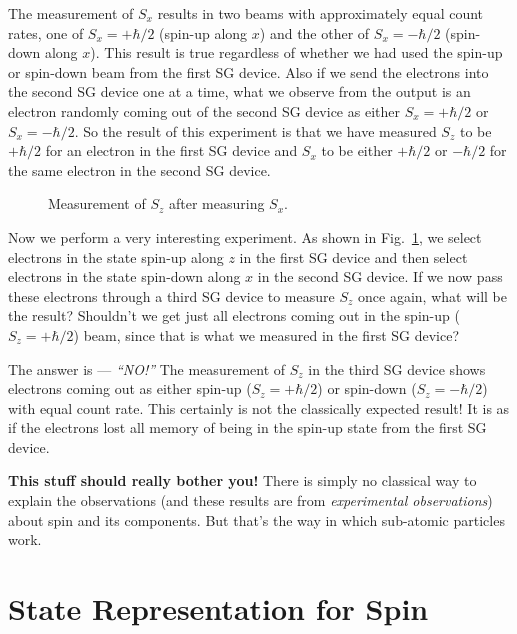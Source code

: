 The measurement of $S_x$ results in two beams with approximately equal
count rates, one of $S_x = +\hbar/2$ (spin-up along $x$) and the other of
$S_x = -\hbar/2$ (spin-down along $x$).  This result is true regardless
of whether we had used the spin-up or spin-down beam from the first SG
device.  Also if we send the electrons into the second SG device one at a
time, what we observe from the output is an electron randomly coming out
of the second SG device as either $S_x = +\hbar/2$ or $S_x = -\hbar/2$.
So the result of this experiment is that we have measured $S_z$ to be
$+\hbar/2$ for an electron in the first SG device and $S_x$ to be either
$+\hbar/2$ or $-\hbar/2$ for the same electron in the second SG device.

\begin{figure}[b]
\begin{center}
\caption{Measurement of $S_z$ after measuring $S_x$.}
\label{fig:SGDevice4}
\end{center}
\end{figure}

Now we perform a very interesting experiment.  As shown in
Fig.~\ref{fig:SGDevice4}, we select electrons in the state spin-up
along $z$ in the first SG device and then select electrons in the state
spin-down along $x$ in the second SG device.  If we now pass these
electrons through a third SG device to measure $S_z$ once again, what
will be the result?  Shouldn't we get just all electrons coming out in
the spin-up ($S_z = +\hbar/2$) beam, since that is what we measured in
the first SG device?

The answer is --- {\it ``NO!''\/}  The measurement of $S_z$ in the third
SG device shows electrons coming out as either spin-up ($S_z = +\hbar/2$)
or spin-down ($S_z = -\hbar/2$) with equal count rate.  This certainly
is not the classically expected result!  It is as if the electrons lost
all memory of being in the spin-up state from the first SG device.

{\bf This stuff should really bother you!}  There is simply no
classical way to explain the observations (and these results are from
{\it experimental observations\/}) about spin and its components.
But that's the way in which sub-atomic particles work.



\section{State Representation for Spin}

